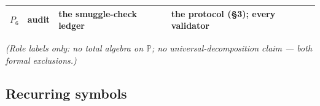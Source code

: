 \begin{longtable}[]{@{}llll@{}}
\begin{minipage}[t]{0.11\columnwidth}
\(P_6\)\strut
\end{minipage} & \begin{minipage}[t]{0.20\columnwidth}\raggedright
audit\strut
\end{minipage} & \begin{minipage}[t]{0.37\columnwidth}\raggedright
the smuggle-check ledger\strut
\end{minipage} & \begin{minipage}[t]{0.22\columnwidth}\raggedright
the protocol (§3); every validator\strut
\end{minipage}\tabularnewline
\bottomrule
\end{longtable}

\emph{(Role labels only: no total algebra on \(\mathbb P\); no universal-decomposition claim --- both formal exclusions.)}

\hypertarget{recurring-symbols}{%
\subsection{Recurring symbols}\label{recurring-symbols}}

